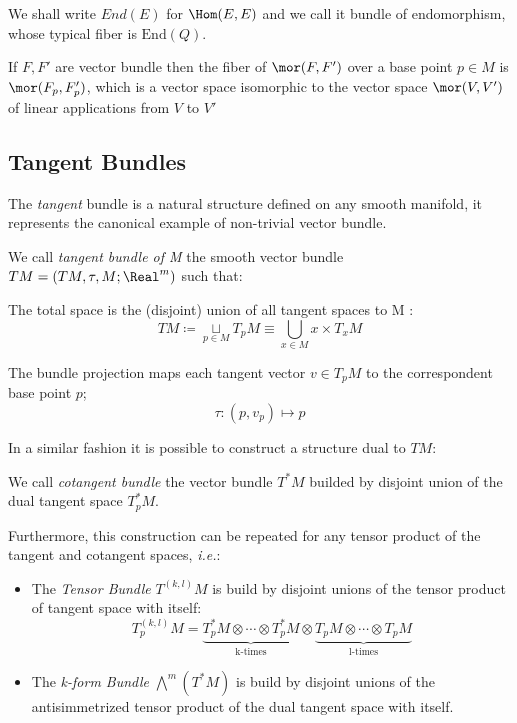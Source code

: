 \documentclass[Main]{subfiles}
\begin{document}
			
			
				We shall write $End(E)$ for $\Hom(E,E)$ and we call it bundle of endomorphism, whose typical fiber is $\textrm{End}(Q)$.
			\begin{remark}
				If $F,F'$ are vector bundle then the fiber of  $\mor(F,F')$ over a base point $p\in M$ is $\mor(F_p,F'_p)$, which is a vector space isomorphic to the vector space $\mor(V,V')$ of linear applications from $V$ to $V'$
			\end{remark}

		\subsection{Tangent Bundles}
			The \emph{tangent} bundle is a natural structure defined on any smooth manifold, it represents the canonical example of  non-trivial vector bundle.

			\begin{definition}
				We call \emph{tangent bundle of M} the smooth vector bundle $TM=(TM,\tau,M;\Real^m)$ such that:
				\begin{compactitemize}
					\item The total space is the (disjoint) union of all tangent spaces to M :
						$$TM \coloneqq \underset{p \in M}{\sqcup} T_pM  \equiv \bigcup_{x\in M} {x}\times T_x M$$
					\item The bundle projection maps each tangent vector $v\in  T_pM$ to the correspondent base point  $p$;
						$$\tau : (p,v_p) \mapsto p $$
				\end{compactitemize}
			\end{definition}
			In a similar fashion it is possible to construct a structure dual to $TM$:
			\begin{definition}
				We call \emph{cotangent bundle} the vector bundle $T^*M$ builded by disjoint union of the dual tangent space $T_p^*M $.
			\end{definition}
			Furthermore, this construction can be repeated for any tensor product of the tangent and cotangent spaces, \textit{i.e.}:
				\begin{itemize}
					\item The \emph{Tensor Bundle} $T^{(k,l)}M$ is build by disjoint unions of the tensor product of tangent space with itself:
					\begin{displaymath}
						T^{(k,l)}_ p M = \underbrace{T^*_pM \otimes \cdots \otimes T^*_pM}_{\textrm{k-times}} \otimes
						\underbrace{T_pM \otimes \cdots \otimes T_pM}_{\textrm{l-times}}
					\end{displaymath}
					\item The \emph{k-form Bundle} $ \bigwedge^m( T^*M)$ is build by disjoint unions of the antisimmetrized tensor product of the dual tangent space with itself.
				\end{itemize}
\end{document}
